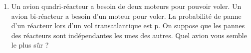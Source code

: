 \documentclass[12pt,a4paper]{article}
\begin{document}
\begin{enumerate}
\item
Un avion quadri-réacteur a besoin de deux moteurs pour pouvoir voler. Un avion bi-réacteur a besoin d'un moteur pour voler. La probabilité de panne d'un réacteur lors d'un vol  transatlantique est p. On suppose que les pannes des réacteurs sont indépendantes les unes des autres. Quel avion vous semble le plus sûr ? 




\end{enumerate}
\end{document}
